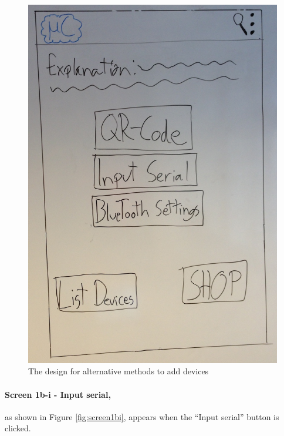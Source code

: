 \begin{figure}[H]
	\centering
		\includegraphics[scale=0.2]{images/Design_guide/Screen1b.png}
	\caption[Screen 1b - Add device manually]{The design for alternative methods to add devices}
	\label{fig:screen1b}
\end{figure}


\paragraph{Screen 1b-i - Input serial,} as shown in Figure \ref{fig:screen1bi}, appears when the ``Input serial'' button is clicked.

